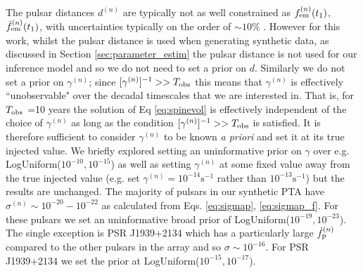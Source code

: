 \documentclass[fleqn,usenatbib,useAMS]{mnras}
\begin{document}
The pulsar distances $d^{(n)}$ are typically not as well constrained as $f_{\rm em}^{(n)} (t_1)$,$\dot{f}_{\rm em}^{(n)} (t_1)$, with uncertainties typically on the order of $\sim 10 \%$ \citep{Arzoumanian2018ApJS..235...37A,Yao2017}. However for this work, whilst the pulsar distance is used when generating synthetic data, as discussed in Section \ref{sec:parameter_estim} the pulsar distance is not used for our inference model and so we do not need to set a prior on $d$. Similarly we do not set a prior on $\gamma^{(n)}$; since $[\gamma^{(n)}]^{-1} >> T_{\rm obs}$ this means that $\gamma^{(n)}$ is effectively ``unobservable" over the decadal timescales that we are interested in. That is, for $T_{\rm obs}$ =10 years the solution of Eq \ref{eq:spinevol} is effectively independent of the choice of $\gamma^{(n)}$ as long as the condition $[\gamma^{(n)}]^{-1} >> T_{\rm obs}$ is satisfied. It is therefore sufficient to consider $\gamma^{(n)}$ to be known \textit{a priori} and set it at its true injected value. We briefly explored setting an uninformative prior on $\gamma$ over e.g. LogUniform($10^{-10}, 10^{-15}$) as well as setting $\gamma^{(n)}$ at some fixed value away from the true injected value (e.g. set $\gamma^{(n)} = 10^{-14} \text{s}^{-1}$ rather than $10^{-13} \text{s}^{-1}$) but the results are unchanged. The majority of pulsars in our synthetic PTA have $\sigma^{(n)} \sim 10^{-20} - 10^{-22}$ as calculated from Eqs. \ref{eq:sigmap}, \ref{eq:sigmap_f}. For these pulsars we set an uninformative broad prior of LogUniform($10^{-19}, 10^{-23}$). The single exception is PSR J1939+2134 which has a particularly large $\dot{f}_{\rm p}^{(n)}$ compared to the other pulsars in the array and so $\sigma \sim 10^{-16}$. For PSR J1939+2134 we set the prior at LogUniform($10^{-15}, 10^{-17}$). \newline
\end{document}
